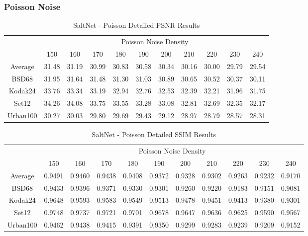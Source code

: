 \subsubsection{Poisson Noise}


\begin{table}[!hbt]
    \centering
    \begin{tabular}{ccccccccccc}
        \hline
        & \multicolumn{10}{c}{Poisson Noise Density} \\
        & 150 & 160 & 170 & 180 & 190 & 200 & 210 & 220 & 230 & 240 \\
        \hline
        Average & 31.48 & 31.19 & 30.99 & 30.83 & 30.58 & 30.34 & 30.16 & 30.00 & 29.79 & 29.54 \\
        \hline
        BSD68 & 31.95 & 31.64 & 31.48 & 31.30 & 31.03 & 30.89 & 30.65 & 30.52 & 30.37 & 30.11 \\
        Kodak24 & 33.76 & 33.34 & 33.19 & 32.94 & 32.76 & 32.53 & 32.39 & 32.21 & 31.96 & 31.75 \\
        Set12 & 34.26 & 34.08 & 33.75 & 33.55 & 33.28 & 33.08 & 32.81 & 32.69 & 32.35 & 32.17 \\
        Urban100 & 30.27 & 30.03 & 29.80 & 29.69 & 29.43 & 29.12 & 28.97 & 28.79 & 28.57 & 28.31 \\
        \hline
    \end{tabular}
    \caption{SaltNet - Poisson Detailed PSNR Results}
\end{table}

\begin{table}[!hbt]
    \centering
    \begin{tabular}{ccccccccccc}
        \hline
        & \multicolumn{10}{c}{Poisson Noise Density} \\
        & 150 & 160 & 170 & 180 & 190 & 200 & 210 & 220 & 230 & 240 \\
        \hline
        Average & 0.9491 & 0.9460 & 0.9438 & 0.9408 & 0.9372 & 0.9328 & 0.9302 & 0.9263 & 0.9232 & 0.9170 \\
        \hline
        BSD68 & 0.9433 & 0.9396 & 0.9371 & 0.9330 & 0.9301 & 0.9260 & 0.9220 & 0.9183 & 0.9151 & 0.9081 \\
        Kodak24 & 0.9648 & 0.9593 & 0.9583 & 0.9549 & 0.9513 & 0.9478 & 0.9451 & 0.9413 & 0.9380 & 0.9301 \\
        Set12 & 0.9748 & 0.9737 & 0.9721 & 0.9701 & 0.9678 & 0.9647 & 0.9636 & 0.9625 & 0.9590 & 0.9567 \\
        Urban100 & 0.9462 & 0.9438 & 0.9415 & 0.9391 & 0.9350 & 0.9299 & 0.9283 & 0.9239 & 0.9209 & 0.9152 \\
        \hline
    \end{tabular}
    \caption{SaltNet - Poisson Detailed SSIM Results}
\end{table}

